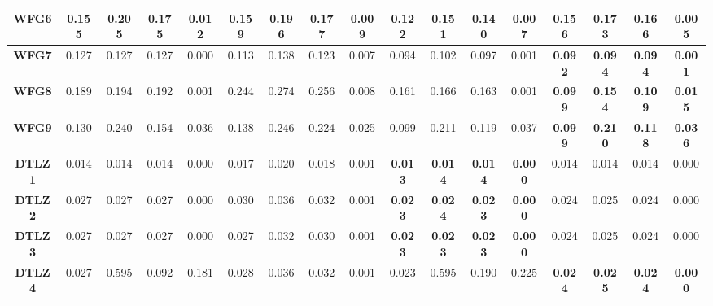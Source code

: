 \begin{table*}[t]
\begin{tabular}{cc|c|c|c|c|c|c|c|c|c|c|c|c|c|c|c}
\multicolumn{1}{c|}{\textbf{WFG6}}  & 0.155        & 0.205        & 0.175         & 0.012        & 0.159        & 0.196        & 0.177         & 0.009        & \textbf{0.122} & \textbf{0.151} & \textbf{0.140} & \textbf{0.007} & 0.156          & 0.173          & 0.166          & 0.005          \\ \hline
\multicolumn{1}{c|}{\textbf{WFG7}}  & 0.127        & 0.127        & 0.127         & 0.000        & 0.113        & 0.138        & 0.123         & 0.007        & 0.094          & 0.102          & 0.097          & 0.001          & \textbf{0.092} & \textbf{0.094} & \textbf{0.094} & \textbf{0.001} \\ \hline
\multicolumn{1}{c|}{\textbf{WFG8}}  & 0.189        & 0.194        & 0.192         & 0.001        & 0.244        & 0.274        & 0.256         & 0.008        & 0.161          & 0.166          & 0.163          & 0.001          & \textbf{0.099} & \textbf{0.154} & \textbf{0.109} & \textbf{0.015} \\ \hline
\multicolumn{1}{c|}{\textbf{WFG9}}  & 0.130        & 0.240        & 0.154         & 0.036        & 0.138        & 0.246        & 0.224         & 0.025        & 0.099          & 0.211          & 0.119          & 0.037          & \textbf{0.099} & \textbf{0.210} & \textbf{0.118} & \textbf{0.036} \\ \hline
\multicolumn{1}{c|}{\textbf{DTLZ1}} & 0.014        & 0.014        & 0.014         & 0.000        & 0.017        & 0.020        & 0.018         & 0.001        & \textbf{0.013} & \textbf{0.014} & \textbf{0.014} & \textbf{0.000} & 0.014          & 0.014          & 0.014          & 0.000          \\ \hline
\multicolumn{1}{c|}{\textbf{DTLZ2}} & 0.027        & 0.027        & 0.027         & 0.000        & 0.030        & 0.036        & 0.032         & 0.001        & \textbf{0.023} & \textbf{0.024} & \textbf{0.023} & \textbf{0.000} & 0.024          & 0.025          & 0.024          & 0.000          \\ \hline
\multicolumn{1}{c|}{\textbf{DTLZ3}} & 0.027        & 0.027        & 0.027         & 0.000        & 0.027        & 0.032        & 0.030         & 0.001        & \textbf{0.023} & \textbf{0.023} & \textbf{0.023} & \textbf{0.000} & 0.024          & 0.025          & 0.024          & 0.000          \\ \hline
\multicolumn{1}{c|}{\textbf{DTLZ4}} & 0.027        & 0.595        & 0.092         & 0.181        & 0.028        & 0.036        & 0.032         & 0.001        & 0.023          & 0.595          & 0.190          & 0.225          & \textbf{0.024} & \textbf{0.025} & \textbf{0.024} & \textbf{0.000} \\ \hline

\end{tabular}
\end{table*}
